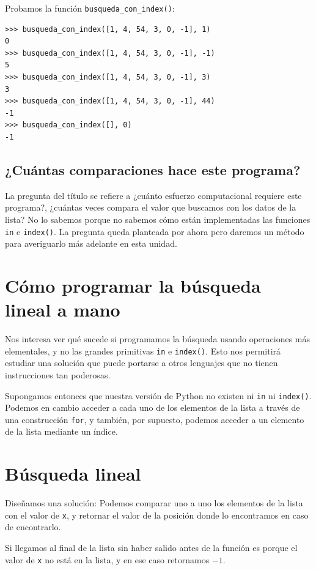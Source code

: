 Probamos la función \verb+busqueda_con_index()+:
\begin{verbatim}
>>> busqueda_con_index([1, 4, 54, 3, 0, -1], 1)
0
>>> busqueda_con_index([1, 4, 54, 3, 0, -1], -1)
5
>>> busqueda_con_index([1, 4, 54, 3, 0, -1], 3)
3
>>> busqueda_con_index([1, 4, 54, 3, 0, -1], 44)
-1
>>> busqueda_con_index([], 0)
-1
\end{verbatim}

\subsection*{¿Cuántas comparaciones hace este programa?}

La pregunta del título se refiere a ¿cuánto esfuerzo computacional requiere
este programa?, ¿cuántas veces compara el valor que buscamos con los datos de
la lista? No lo sabemos porque no sabemos cómo están implementadas las
funciones \lstinline+in+ e \lstinline+index()+. La pregunta queda planteada
por ahora pero daremos un método para averiguarlo más adelante en esta unidad.


\section{Cómo programar la búsqueda lineal a mano}

Nos interesa ver qué sucede si programamos la búsqueda usando operaciones más
elementales, y no las grandes primitivas \lstinline+in+ e \lstinline+index()+.
Esto nos permitirá estudiar una solución que puede portarse a otros lenguajes
que no tienen instrucciones tan poderosas.


Supongamos entonces que nuestra versión de Python no existen ni \lstinline+in+
ni \lstinline+index()+. Podemos en cambio acceder a cada uno de los elementos
de la lista a través de una construcción \lstinline+for+, y también, por
supuesto, podemos acceder a un elemento de la lista mediante un índice.

\section{Búsqueda lineal}

Diseñamos una solución: Podemos comparar uno a uno los elementos de la
lista con el valor de \lstinline!x!, y retornar el valor de la posición
donde lo encontramos en caso de encontrarlo.

Si llegamos al final de la lista sin haber salido antes de la función es
porque el valor de \lstinline!x! no está en la lista, y en ese caso
retornamos $-1$.

